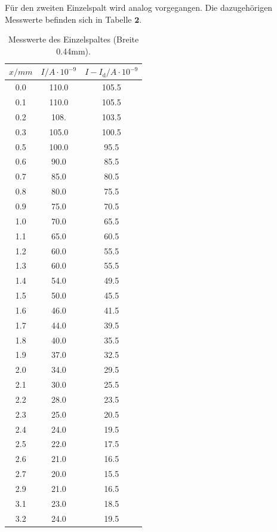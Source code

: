 Für den zweiten Einzelspalt wird analog vorgegangen. Die dazugehörigen Messwerte befinden sich in Tabelle $\mathbf{2}$.
\begin{table}
\label{tab:e2}
    \centering
\caption{Messwerte des Einzelspaltes (Breite 0.44mm).}
\begin{minipage}{0.46\textwidth}
    \centering
	\begin{tabular}{c|c|c}
		\toprule
		{$x / mm$} & {$I / A\cdot10^{-9}$} & {$I - I_\text{d} / A\cdot10^{-9}$}\\
		\hline
        \midrule
        0.0 &110.0&105.5\\
        0.1 &110.0&105.5\\
        0.2 &108.&103.5\\
        0.3 &105.0&100.5\\
        0.5 &100.0&95.5\\
        0.6 &90.0&85.5\\
        0.7 &85.0&80.5\\
        0.8 &80.0&75.5\\
        0.9 &75.0&70.5\\
        1.0 &70.0&65.5\\
        1.1 &65.0&60.5\\
        1.2 &60.0&55.5\\
        1.3 &60.0&55.5\\
        1.4 &54.0&49.5\\
        1.5 &50.0&45.5\\
        1.6 &46.0&41.5\\
        1.7 &44.0&39.5\\
        1.8 &40.0&35.5\\
        1.9 &37.0&32.5\\
        2.0 &34.0&29.5\\
        2.1 &30.0&25.5\\
        2.2 &28.0&23.5\\
        2.3 &25.0&20.5\\
        2.4 &24.0&19.5\\
        2.5 &22.0&17.5\\
        2.6 &21.0&16.5\\
        2.7 &20.0&15.5\\
        2.9 &21.0&16.5\\
        3.1 &23.0&18.5\\
        3.2 &24.0&19.5\\
		\bottomrule 
	\end{tabular}
\end{minipage}

\end{table}
